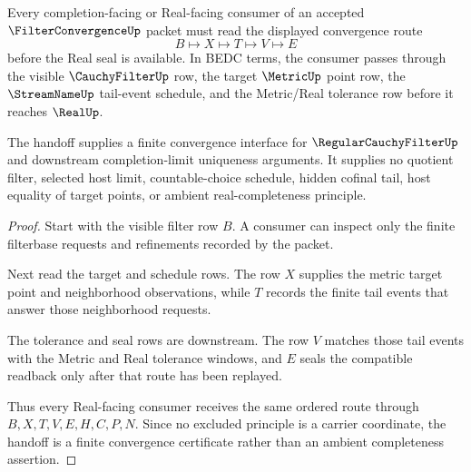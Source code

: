\begin{theorem}
\label{thm:filter-convergence-real-seal-handoff}
Every completion-facing or Real-facing consumer of an accepted $\FilterConvergenceUp$ packet must read the displayed convergence route
$$
B \longmapsto X \longmapsto T \longmapsto V \longmapsto E
$$
before the Real seal is available. In BEDC terms, the consumer passes through the visible $\CauchyFilterUp$ row, the target $\MetricUp$ point row, the $\StreamNameUp$ tail-event schedule, and the Metric/Real tolerance row before it reaches $\RealUp$.

The handoff supplies a finite convergence interface for $\RegularCauchyFilterUp$ and downstream completion-limit uniqueness arguments. It supplies no quotient filter, selected host limit, countable-choice schedule, hidden cofinal tail, host equality of target points, or ambient real-completeness principle.
\end{theorem}
\begin{proof}
Start with the visible filter row $B$. A consumer can inspect only the finite filterbase requests and refinements recorded by the packet.

Next read the target and schedule rows. The row $X$ supplies the metric target point and neighborhood observations, while $T$ records the finite tail events that answer those neighborhood requests.

The tolerance and seal rows are downstream. The row $V$ matches those tail events with the Metric and Real tolerance windows, and $E$ seals the compatible readback only after that route has been replayed.

Thus every Real-facing consumer receives the same ordered route through $B,X,T,V,E,H,C,P,N$. Since no excluded principle is a carrier coordinate, the handoff is a finite convergence certificate rather than an ambient completeness assertion.
\end{proof}

